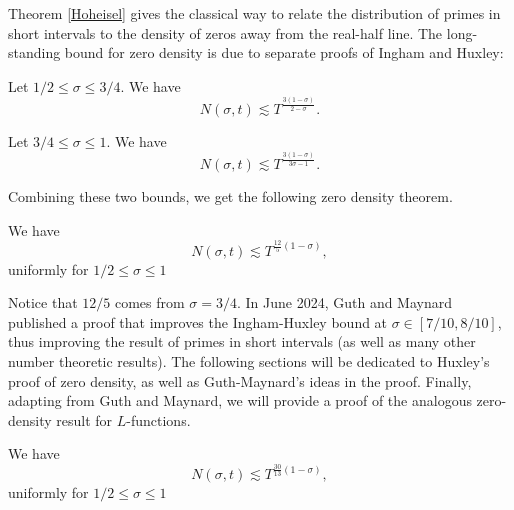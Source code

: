 Theorem \ref{Hoheisel} gives the classical way to relate the distribution of primes in short intervals to the density of zeros away from the real-half line. The long-standing bound for zero density is due to separate proofs of Ingham and Huxley:
\begin{theorem}
    Let $1/2\leq \sigma\leq 3/4$. We have \[
        N(\sigma,t)\lesssim T^{\frac{3(1-\sigma)}{2-\sigma}}.
        \]
\end{theorem}
\begin{theorem}
    Let $3/4\leq \sigma\leq 1$. We have \[
        N(\sigma,t)\lesssim T^{\frac{3(1-\sigma)}{3\sigma-1}}.
        \]
\end{theorem}

Combining these two bounds, we get the following zero density theorem.
\begin{theorem}
   We have \[
    N(\sigma,t)\lesssim T^{\frac{12}{5}(1-\sigma)},
    \]
    uniformly for $1/2\leq \sigma\leq 1$
\end{theorem}
Notice that $12/5$ comes from $\sigma = 3/4$. In June 2024, Guth and Maynard published a proof that improves the Ingham-Huxley bound at $\sigma \in [7/10,8/10]$, thus improving the result of primes in short intervals (as well as many other number theoretic results). The following sections will be dedicated to Huxley's proof of zero density, as well as Guth-Maynard's ideas in the proof. Finally, adapting from Guth and Maynard, we will provide a proof of the analogous zero-density result for $L$-functions.
\begin{theorem}
    We have \[
     N(\sigma,t)\lesssim T^{\frac{30}{13}(1-\sigma)},
     \]
     uniformly for $1/2\leq \sigma\leq 1$
 \end{theorem}
